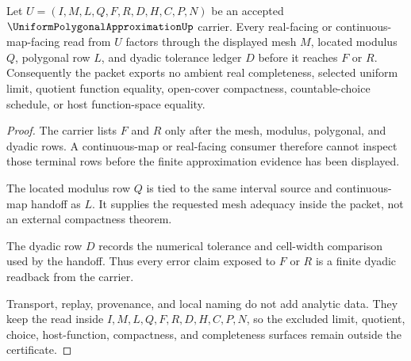 \begin{theorem}
\label{thm:uniform-polygonal-approximation-nonescape}
Let $U=(I,M,L,Q,F,R,D,H,C,P,N)$ be an accepted $\UniformPolygonalApproximationUp$ carrier. Every real-facing or continuous-map-facing read from $U$ factors through the displayed mesh $M$, located modulus $Q$, polygonal row $L$, and dyadic tolerance ledger $D$ before it reaches $F$ or $R$. Consequently the packet exports no ambient real completeness, selected uniform limit, quotient function equality, open-cover compactness, countable-choice schedule, or host function-space equality.
\end{theorem}
\begin{proof}
The carrier lists $F$ and $R$ only after the mesh, modulus, polygonal, and dyadic rows. A continuous-map or real-facing consumer therefore cannot inspect those terminal rows before the finite approximation evidence has been displayed.

The located modulus row $Q$ is tied to the same interval source and continuous-map handoff as $L$. It supplies the requested mesh adequacy inside the packet, not an external compactness theorem.

The dyadic row $D$ records the numerical tolerance and cell-width comparison used by the handoff. Thus every error claim exposed to $F$ or $R$ is a finite dyadic readback from the carrier.

Transport, replay, provenance, and local naming do not add analytic data. They keep the read inside $I,M,L,Q,F,R,D,H,C,P,N$, so the excluded limit, quotient, choice, host-function, compactness, and completeness surfaces remain outside the certificate.
\end{proof}

